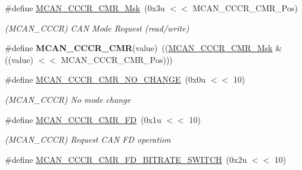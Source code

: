 \begin{DoxyCompactItemize}
\item 
\mbox{\label{group__SAMV71__MCAN_ga4f1990ddca877eced483f7aa6eba8611}} 
\#define \mbox{\hyperlink{group__SAMV71__MCAN_ga4f1990ddca877eced483f7aa6eba8611}{M\+C\+A\+N\+\_\+\+C\+C\+C\+R\+\_\+\+C\+M\+R\+\_\+\+Msk}}~(0x3u $<$$<$ M\+C\+A\+N\+\_\+\+C\+C\+C\+R\+\_\+\+C\+M\+R\+\_\+\+Pos)
\begin{DoxyCompactList}\small\item\em (M\+C\+A\+N\+\_\+\+C\+C\+CR) C\+AN Mode Request (read/write) \end{DoxyCompactList}\item 
\mbox{\label{group__SAMV71__MCAN_ga507c30ed0d424ca6093048a54785f8cb}} 
\#define {\bfseries M\+C\+A\+N\+\_\+\+C\+C\+C\+R\+\_\+\+C\+MR}(value)~((\mbox{\hyperlink{group__SAMV71__MCAN_ga4f1990ddca877eced483f7aa6eba8611}{M\+C\+A\+N\+\_\+\+C\+C\+C\+R\+\_\+\+C\+M\+R\+\_\+\+Msk}} \& ((value) $<$$<$ M\+C\+A\+N\+\_\+\+C\+C\+C\+R\+\_\+\+C\+M\+R\+\_\+\+Pos)))
\item 
\mbox{\label{group__SAMV71__MCAN_gad1f5468a2fc76d398a658e796072d346}} 
\#define \mbox{\hyperlink{group__SAMV71__MCAN_gad1f5468a2fc76d398a658e796072d346}{M\+C\+A\+N\+\_\+\+C\+C\+C\+R\+\_\+\+C\+M\+R\+\_\+\+N\+O\+\_\+\+C\+H\+A\+N\+GE}}~(0x0u $<$$<$ 10)
\begin{DoxyCompactList}\small\item\em (M\+C\+A\+N\+\_\+\+C\+C\+CR) No mode change \end{DoxyCompactList}\item 
\mbox{\label{group__SAMV71__MCAN_ga28057c9d6774e797e29167e55ab0e50f}} 
\#define \mbox{\hyperlink{group__SAMV71__MCAN_ga28057c9d6774e797e29167e55ab0e50f}{M\+C\+A\+N\+\_\+\+C\+C\+C\+R\+\_\+\+C\+M\+R\+\_\+\+FD}}~(0x1u $<$$<$ 10)
\begin{DoxyCompactList}\small\item\em (M\+C\+A\+N\+\_\+\+C\+C\+CR) Request C\+AN FD operation \end{DoxyCompactList}\item 
\mbox{\label{group__SAMV71__MCAN_ga81e172de8451e1c44243d29ef77ca637}} 
\#define \mbox{\hyperlink{group__SAMV71__MCAN_ga81e172de8451e1c44243d29ef77ca637}{M\+C\+A\+N\+\_\+\+C\+C\+C\+R\+\_\+\+C\+M\+R\+\_\+\+F\+D\+\_\+\+B\+I\+T\+R\+A\+T\+E\+\_\+\+S\+W\+I\+T\+CH}}~(0x2u $<$$<$ 10)
$$
\end{DoxyCompactItemize}
